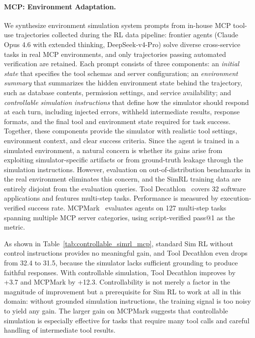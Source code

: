 \paragraph{MCP: Environment Adaptation.}
We synthesize environment simulation system prompts from in-house MCP tool-use trajectories collected during the RL data pipeline: frontier agents (Claude Opus 4.6 with extended thinking, DeepSeek-v4-Pro) solve diverse cross-service tasks in real MCP environments, and only trajectories passing automated verification are retained.
Each prompt consists of three components: an \emph{initial state} that specifies the tool schemas and server configuration; an \emph{environment summary} that summarizes the hidden environment state behind the trajectory, such as database contents, permission settings, and service availability; and \emph{controllable simulation instructions} that define how the simulator should respond at each turn, including injected errors, withheld intermediate results, response formats, and the final tool and environment state required for task success.
Together, these components provide the simulator with realistic tool settings, environment context, and clear success criteria.
Since the agent is trained in a simulated environment, a natural concern is whether its gains arise from exploiting simulator-specific artifacts or from ground-truth leakage through the simulation instructions.
However, evaluation on out-of-distribution benchmarks in the real environment eliminates this concern, and the SimRL training data are entirely disjoint from the evaluation queries.
Tool Decathlon~\citep{li2025tool} covers 32 software applications and features multi-step tasks. Performance is measured by execution-verified success rate.
MCPMark~\citep{wu2025mcpmark} evaluates agents on 127 multi-step tasks spanning multiple MCP server categories, using script-verified pass@1 as the metric.

As shown in Table~\ref{tab:controllable_simrl_mcp}, standard Sim RL without control instructions provides no meaningful gain, and Tool Decathlon even drops from 32.4 to 31.5, because the simulator lacks sufficient grounding to produce faithful responses.
With controllable simulation, Tool Decathlon improves by +3.7 and MCPMark by +12.3.
Controllability is not merely a factor in the magnitude of improvement but a prerequisite for Sim RL to work at all in this domain: without grounded simulation instructions, the training signal is too noisy to yield any gain.
The larger gain on MCPMark suggests that controllable simulation is especially effective for tasks that require many tool calls and careful handling of intermediate tool results.


